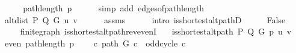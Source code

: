 \begin{isabellebody}
\ \ \isamarkupfalse%
\ \isamarkupfalse%
\ {\isachardoublequoteopen}{\isachardot}{\kern0pt}{\isachardot}{\kern0pt}{\isachardot}{\kern0pt}\ {\isacharequal}{\kern0pt}\ path{\isacharunderscore}{\kern0pt}length\ p{\isachardoublequoteclose}\isanewline
\ \ \ \ \isamarkupfalse%
\ {\isacharparenleft}{\kern0pt}simp\ add{\isacharcolon}{\kern0pt}\ edges{\isacharunderscore}{\kern0pt}of{\isacharunderscore}{\kern0pt}path{\isacharunderscore}{\kern0pt}length{\isacharparenright}{\kern0pt}\isanewline
\ \ \isamarkupfalse%
\ \isamarkupfalse%
\ {\isachardoublequoteopen}{\isachardot}{\kern0pt}{\isachardot}{\kern0pt}{\isachardot}{\kern0pt}\ {\isacharequal}{\kern0pt}\ alt{\isacharunderscore}{\kern0pt}dist\ P\ Q\ G\ u\ v{\isachardoublequoteclose}\isanewline
\ \ \ \ \isamarkupfalse%
\ assms{\isacharparenleft}{\kern0pt}{}{\isacharparenright}{\kern0pt}\isanewline
\ \ \ \ \isamarkupfalse%
\ {\isacharparenleft}{\kern0pt}intro\ is{\isacharunderscore}{\kern0pt}shortest{\isacharunderscore}{\kern0pt}alt{\isacharunderscore}{\kern0pt}pathD{\isacharparenleft}{\kern0pt}{}{\isacharparenright}{\kern0pt}{\isacharparenright}{\kern0pt}\isanewline
\ \ \isamarkupfalse%
\ \isamarkupfalse%
\ False\isanewline
\ \ \ \ \isacommand{{\isachardot}{\kern0pt}{\isachardot}{\kern0pt}}\isamarkupfalse%
\isanewline
{}\isamarkupfalse%
%
\endisatagproof
{\isafoldproof}%
%
\isadelimproof
\isanewline
%
\endisadelimproof
%
\isadeliminvisible
\isanewline
%
\endisadeliminvisible
%
\isataginvisible
{}\isamarkupfalse%
\ {\isacharparenleft}{\kern0pt}\ finite{\isacharunderscore}{\kern0pt}graph{\isacharparenright}{\kern0pt}\ is{\isacharunderscore}{\kern0pt}shortest{\isacharunderscore}{\kern0pt}alt{\isacharunderscore}{\kern0pt}path{\isacharunderscore}{\kern0pt}rev{\isacharunderscore}{\kern0pt}evenI{\isacharcolon}{\kern0pt}\isanewline
\ \ \ {\isachardoublequoteopen}is{\isacharunderscore}{\kern0pt}shortest{\isacharunderscore}{\kern0pt}alt{\isacharunderscore}{\kern0pt}path\ P\ Q\ G\ p\ u\ v{\isachardoublequoteclose}\isanewline
\ \ \ {\isachardoublequoteopen}even\ {\isacharparenleft}{\kern0pt}path{\isacharunderscore}{\kern0pt}length\ p{\isacharparenright}{\kern0pt}{\isachardoublequoteclose}\isanewline
\ \ \ {\isachardoublequoteopen}{\isasymnot}\ {\isacharparenleft}{\kern0pt}{\isasymexists}c{\isachardot}{\kern0pt}\ path\ G\ c\ {\isasymand}\ odd{\isacharunderscore}{\kern0pt}cycle\ c{\isacharparenright}{\kern0pt}{\isachardoublequoteclose}\isanewline

\end{isabellebody}
